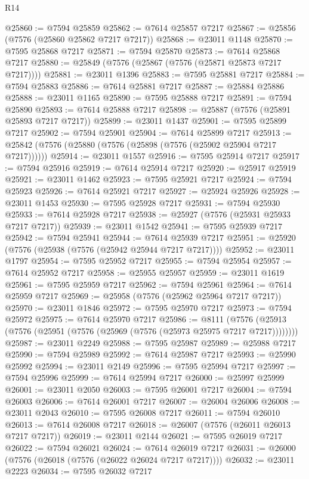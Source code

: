 \begin{lexlean}{R14}
\begin{coremodule}
@25860 := @7594 @25859
@25862 := @7614 @25857 @7217
@25867 := @25856 (@7576 (@25860 @25862 @7217 @7217))
@25868 := @23011 @1148
@25870 := @7595 @25868 @7217
@25871 := @7594 @25870
@25873 := @7614 @25868 @7217
@25880 := @25849 (@7576 (@25867 (@7576 (@25871 @25873 @7217 @7217))))
@25881 := @23011 @1396
@25883 := @7595 @25881 @7217
@25884 := @7594 @25883
@25886 := @7614 @25881 @7217
@25887 := @25884 @25886
@25888 := @23011 @1165
@25890 := @7595 @25888 @7217
@25891 := @7594 @25890
@25893 := @7614 @25888 @7217
@25898 := @25887 (@7576 (@25891 @25893 @7217 @7217))
@25899 := @23011 @1437
@25901 := @7595 @25899 @7217
@25902 := @7594 @25901
@25904 := @7614 @25899 @7217
@25913 := @25842 (@7576 (@25880 (@7576 (@25898 (@7576 (@25902 @25904 @7217 @7217))))))
@25914 := @23011 @1557
@25916 := @7595 @25914 @7217
@25917 := @7594 @25916
@25919 := @7614 @25914 @7217
@25920 := @25917 @25919
@25921 := @23011 @1462
@25923 := @7595 @25921 @7217
@25924 := @7594 @25923
@25926 := @7614 @25921 @7217
@25927 := @25924 @25926
@25928 := @23011 @1453
@25930 := @7595 @25928 @7217
@25931 := @7594 @25930
@25933 := @7614 @25928 @7217
@25938 := @25927 (@7576 (@25931 @25933 @7217 @7217))
@25939 := @23011 @1542
@25941 := @7595 @25939 @7217
@25942 := @7594 @25941
@25944 := @7614 @25939 @7217
@25951 := @25920 (@7576 (@25938 (@7576 (@25942 @25944 @7217 @7217))))
@25952 := @23011 @1797
@25954 := @7595 @25952 @7217
@25955 := @7594 @25954
@25957 := @7614 @25952 @7217
@25958 := @25955 @25957
@25959 := @23011 @1619
@25961 := @7595 @25959 @7217
@25962 := @7594 @25961
@25964 := @7614 @25959 @7217
@25969 := @25958 (@7576 (@25962 @25964 @7217 @7217))
@25970 := @23011 @1846
@25972 := @7595 @25970 @7217
@25973 := @7594 @25972
@25975 := @7614 @25970 @7217
@25986 := @8111
    (@7576 (@25913 (@7576 (@25951 (@7576 (@25969 (@7576 (@25973 @25975 @7217 @7217))))))))
@25987 := @23011 @2249
@25988 := @7595 @25987
@25989 := @25988 @7217
@25990 := @7594 @25989
@25992 := @7614 @25987 @7217
@25993 := @25990 @25992
@25994 := @23011 @2149
@25996 := @7595 @25994 @7217
@25997 := @7594 @25996
@25999 := @7614 @25994 @7217
@26000 := @25997 @25999
@26001 := @23011 @2050
@26003 := @7595 @26001 @7217
@26004 := @7594 @26003
@26006 := @7614 @26001 @7217
@26007 := @26004 @26006
@26008 := @23011 @2043
@26010 := @7595 @26008 @7217
@26011 := @7594 @26010
@26013 := @7614 @26008 @7217
@26018 := @26007 (@7576 (@26011 @26013 @7217 @7217))
@26019 := @23011 @2144
@26021 := @7595 @26019 @7217
@26022 := @7594 @26021
@26024 := @7614 @26019 @7217
@26031 := @26000 (@7576 (@26018 (@7576 (@26022 @26024 @7217 @7217))))
@26032 := @23011 @2223
@26034 := @7595 @26032 @7217

\end{coremodule}
\end{lexlean}
